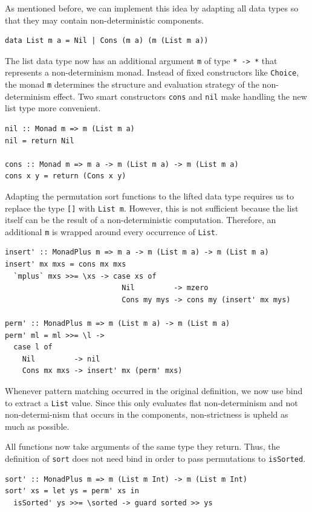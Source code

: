 \documentclass[a4paper, 11pt, fleqn, twoside]{scrreprt}
\newcommand{\hinl}[1]{\texttt{#1}}
\begin{document}
As mentioned before, we can implement this idea by adapting all data types so that they may contain non-deterministic components.

\begin{verbatim}
data List m a = Nil | Cons (m a) (m (List m a))
\end{verbatim}

The list data type now has an additional argument \hinl{m} of type \hinl{* -> *} that represents a non-determinism monad.
Instead of fixed constructors like \hinl{Choice}, the monad \hinl{m} determines the structure and evaluation strategy of the non-determinism effect.
Two smart constructors \hinl{cons} and \hinl{nil} make handling the new list type more convenient.

\begin{verbatim}
nil :: Monad m => m (List m a)
nil = return Nil

cons :: Monad m => m a -> m (List m a) -> m (List m a)
cons x y = return (Cons x y)
\end{verbatim}

Adapting the permutation sort functions to the lifted data type requires us to replace the type \hinl{[]} with \hinl{List m}.
However, this is not sufficient because the list itself can be the result of a non-deterministic computation.
Therefore, an additional \hinl{m} is wrapped around every occurrence of \hinl{List}.

\begin{verbatim}
insert' :: MonadPlus m => m a -> m (List m a) -> m (List m a)
insert' mx mxs = cons mx mxs
  `mplus` mxs >>= \xs -> case xs of
                           Nil         -> mzero
                           Cons my mys -> cons my (insert' mx mys)

perm' :: MonadPlus m => m (List m a) -> m (List m a)
perm' ml = ml >>= \l ->
  case l of
    Nil         -> nil
    Cons mx mxs -> insert' mx (perm' mxs)
\end{verbatim}

Whenever pattern matching occurred in the original definition, we now use bind to extract a \hinl{List} value.
Since this only evaluates flat non-determinism and not non-determi-nism that occurs in the components, non-strictness is upheld as much as possible.

All functions now take arguments of the same type they return.
Thus, the definition of \hinl{sort} does not need bind in order to pass permutations to \hinl{isSorted}.

\begin{verbatim}
sort' :: MonadPlus m => m (List m Int) -> m (List m Int)
sort' xs = let ys = perm' xs in
  isSorted' ys >>= \sorted -> guard sorted >> ys
\end{verbatim}
\end{document}
